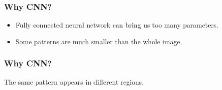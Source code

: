 \documentclass{beamer}
\begin{document}
\begin{frame}
\frametitle{Why CNN?}
\begin{itemize}
	\item Fully connected neural network can bring us too many parameters.
	\item Some patterns are much smaller than the whole image.
\end{itemize}

\begin{figure}
	\hfill
{}
\hfill
{}
\hfill
\end{figure}

\end{frame}


\begin{frame}
	\frametitle{Why CNN?}
The same pattern appears in different regions.
	
	\begin{figure}
		\hfill
		\hfill
		\hfill
	\end{figure}
	
\end{frame}
\end{document}
